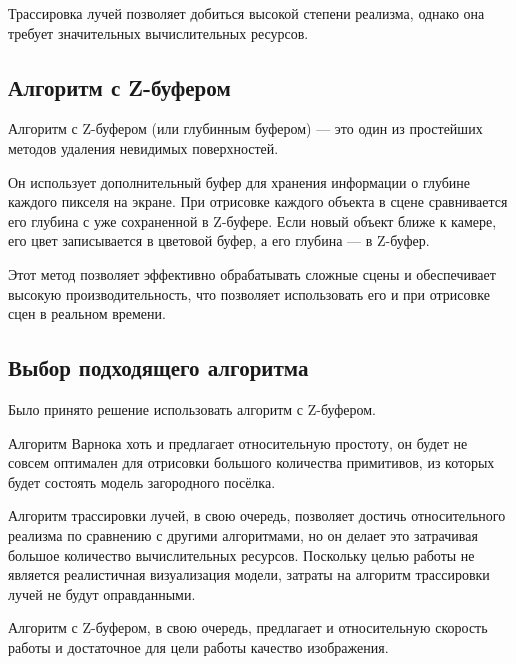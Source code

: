 Трассировка лучей позволяет добиться высокой степени реализма, однако она требует значительных вычислительных ресурсов.

\subsection*{Алгоритм с Z-буфером}

Алгоритм с Z-буфером (или глубинным буфером) --- это один из простейших~\cite{Rogers} методов удаления невидимых поверхностей. 

Он использует дополнительный буфер для хранения информации о глубине каждого пикселя на экране. При отрисовке каждого объекта в сцене сравнивается его глубина с уже сохраненной в Z-буфере. Если новый объект ближе к камере, его цвет записывается в цветовой буфер, а его глубина — в Z-буфер. 

Этот метод позволяет эффективно обрабатывать сложные сцены и обеспечивает высокую производительность, что позволяет использовать его и при отрисовке сцен в реальном времени.

\subsection*{Выбор подходящего алгоритма}

Было принято решение использовать алгоритм с Z-буфером. 

Алгоритм Варнока хоть и предлагает относительную простоту, он будет не совсем оптимален для отрисовки большого количества примитивов, из которых будет состоять модель загородного посёлка.

Алгоритм трассировки лучей, в свою очередь, позволяет достичь относительного реализма по сравнению с другими алгоритмами, но он делает это затрачивая большое количество вычислительных ресурсов. Поскольку целью работы не является реалистичная визуализация модели, затраты на алгоритм трассировки лучей не будут оправданными.

Алгоритм с Z-буфером, в свою очередь, предлагает и относительную скорость работы и достаточное для цели работы качество изображения.